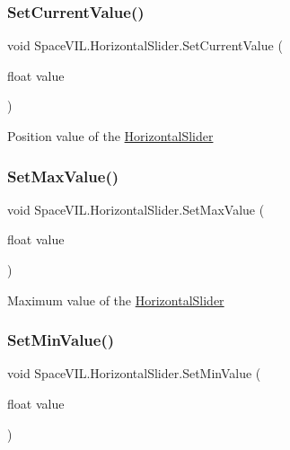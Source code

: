 \subsubsection{\texorpdfstring{Set\+Current\+Value()}{SetCurrentValue()}}
{\footnotesize\ttfamily void Space\+V\+I\+L.\+Horizontal\+Slider.\+Set\+Current\+Value (\begin{DoxyParamCaption}\item[{float}]{value }\end{DoxyParamCaption})}



Position value of the \mbox{\hyperlink{class_space_v_i_l_1_1_horizontal_slider}{Horizontal\+Slider}} 

\mbox{\label{class_space_v_i_l_1_1_horizontal_slider_a371d41e7d45c1d027a7d1a94209e4ecb}} 
\subsubsection{\texorpdfstring{Set\+Max\+Value()}{SetMaxValue()}}
{\footnotesize\ttfamily void Space\+V\+I\+L.\+Horizontal\+Slider.\+Set\+Max\+Value (\begin{DoxyParamCaption}\item[{float}]{value }\end{DoxyParamCaption})}



Maximum value of the \mbox{\hyperlink{class_space_v_i_l_1_1_horizontal_slider}{Horizontal\+Slider}} 

\mbox{\label{class_space_v_i_l_1_1_horizontal_slider_aba8cd3fc86a3b670f03badbdd0a28b8c}} 
\subsubsection{\texorpdfstring{Set\+Min\+Value()}{SetMinValue()}}
{\footnotesize\ttfamily void Space\+V\+I\+L.\+Horizontal\+Slider.\+Set\+Min\+Value (\begin{DoxyParamCaption}\item[{float}]{value }\end{DoxyParamCaption})}



